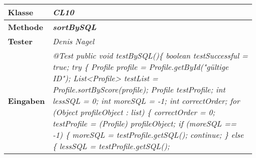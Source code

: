 \begin{longtable}{|p{4cm}|p{11cm}|}
\hline
\textbf{Klasse} & \textit{\textbf{CL10}} \\
\hline
\textbf{Methode} & \textit{\textbf{sortBySQL}} \\
\hline
\textbf{Tester} & \textit{Denis Nagel} \\
\hline
\textbf{Eingaben} & \textit{
@Test \newline
public void testBySQL()\{ \newline
\hspace*{3mm}    boolean testSuccessful = true; \newline
\hspace*{3mm}    try \{ \newline
\hspace*{6mm}      	 Profile profile = Profile.getById("gültige ID"); \newline
\hspace*{6mm}        List<Profile> testList = Profile.sortByScore(profile); \newline
\hspace*{6mm}        Profile testProfile; \newline
\hspace*{6mm}        int lessSQL = 0; \newline
\hspace*{6mm}        int moreSQL = -1; \newline
\hspace*{6mm}        int correctOrder; \newline
\hspace*{6mm}        for (Object profileObject : list) \{ \newline
\hspace*{9mm}            correctOrder = 0; \newline
\hspace*{9mm}            testProfile = (Profile) profileObject; \newline
\hspace*{9mm}            if (moreSQL == -1) \{ \newline
\hspace*{12mm}                moreSQL = testProfile.getSQL(); \newline
\hspace*{12mm}                continue; \newline
\hspace*{9mm}            \} else \{ \newline
\hspace*{12mm}                lessSQL = testProfile.getSQL(); \newline
}
\end{longtable}

